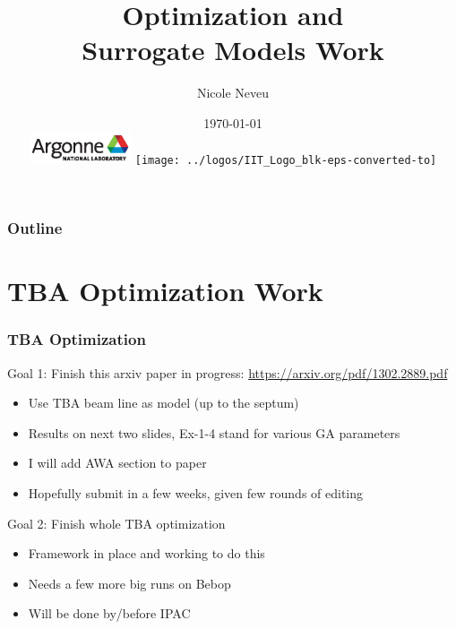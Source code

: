 \documentclass[professionalfonts,t]{beamer}
\title[]{Optimization and \\ Surrogate Models Work}
\author[N.Neveu]{{\Large Nicole Neveu}}
\institute[ANL, IIT] %
{   Illinois Institute of Technology \\
	Argonne National Laboratory \\
}
\date{ \today \\
\includegraphics[width=3cm,keepaspectratio]{../logos/Argonne_cmyk_black}%
\hfill \hfill \hfill%
\texttt{[image: ../logos/IIT\_Logo\_blk-eps-converted-to]}%
}
\begin{document}

\begin{frame}
  \titlepage
\end{frame}
\begin{frame}
	\frametitle{Outline}
	\tableofcontents
\end{frame}




\section{TBA Optimization Work}
\begin{frame}
	\frametitle{TBA Optimization}
	Goal 1: Finish this arxiv paper in progress: \url{https://arxiv.org/pdf/1302.2889.pdf}
		\begin{itemize}
			\item Use TBA beam line as model (up to the septum)
			\item Results on next two slides, Ex-1-4 stand for various GA parameters
			\item I will add AWA section to paper
			\item Hopefully submit in a few weeks, given few rounds of editing
		\end{itemize} 
	\vspace{1em}
	Goal 2: Finish whole TBA optimization
		\begin{itemize}
			\item Framework in place and working to do this
			\item Needs a few more big runs on Bebop 
			\item Will be done by/before IPAC
		\end{itemize}

\end{frame}
\end{document}
